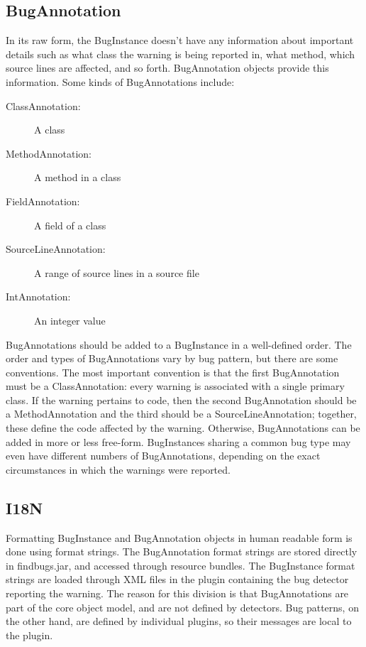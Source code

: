 \documentclass[11pt]{article}
\begin{document}
\subsection{BugAnnotation}

In its raw form, the BugInstance doesn't have any information about
important details such as what class the warning is being reported in,
what method, which source lines are affected, and so forth.
BugAnnotation objects provide this information.  Some kinds of BugAnnotations
include:
\begin{description}
\item[ClassAnnotation:] A class
\item[MethodAnnotation:] A method in a class
\item[FieldAnnotation:] A field of a class
\item[SourceLineAnnotation:] A range of source lines in a source file
\item[IntAnnotation:] An integer value
\end{description}

BugAnnotations should be added to a BugInstance in a well-defined order.
The order and types of BugAnnotations vary by bug pattern, but there are
some conventions.  The most important convention is that the first BugAnnotation
must be a ClassAnnotation: every warning is associated with a single primary class.
If the warning pertains to code, then the second BugAnnotation should be
a MethodAnnotation and the third should be a SourceLineAnnotation;
together, these define the code affected by the warning.  Otherwise,
BugAnnotations can be added in more or less free-form.  BugInstances sharing
a common bug type may even have different numbers of BugAnnotations,
depending on the exact circumstances in which the warnings were reported.

\subsection{I18N}

Formatting BugInstance and BugAnnotation objects in human readable
form is done using format strings.  The BugAnnotation format strings
are stored directly in findbugs.jar, and accessed through resource
bundles.  The BugInstance format strings are loaded through
XML files in the plugin containing the bug detector reporting the
warning.  The reason for this division is that BugAnnotations
are part of the core object model, and are not defined by detectors.
Bug patterns, on the other hand, are defined by individual plugins,
so their messages are local to the plugin.
\end{document}
